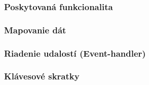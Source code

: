 \subsubsection{Poskytovaná funkcionalita}

\subsubsection{Mapovanie dát}



\subsubsection{Riadenie udalostí (Event-handler)}

\subsubsection{Klávesové skratky}

